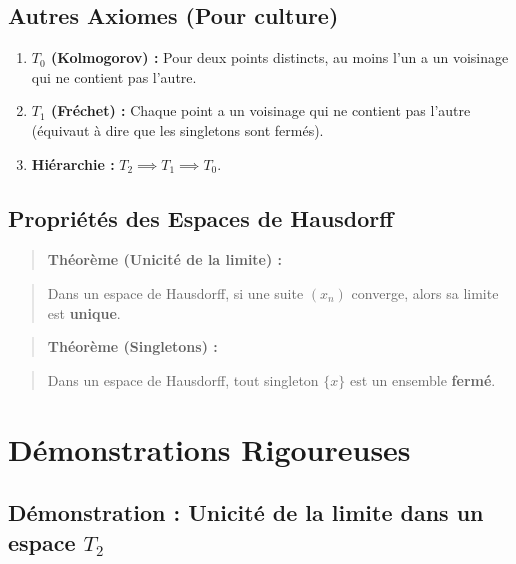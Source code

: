 \documentclass[11pt,a4paper]{article}
\begin{document}
\subsection{Autres Axiomes (Pour culture)}

\begin{enumerate}
\item \textbf{$T_0$ (Kolmogorov) :} Pour deux points distincts, au moins l'un a un voisinage qui ne contient pas l'autre.

\item \textbf{$T_1$ (Fréchet) :} Chaque point a un voisinage qui ne contient pas l'autre (équivaut à dire que les singletons sont fermés).

\item \textbf{Hiérarchie :} $T_2 \implies T_1 \implies T_0$.
\end{enumerate}

\subsection{Propriétés des Espaces de Hausdorff}

\begin{quote}
\textbf{Théorème (Unicité de la limite) :}
\end{quote}
\begin{quote}
Dans un espace de Hausdorff, si une suite $(x_n)$ converge, alors sa limite est \textbf{unique}.
\end{quote}

\begin{quote}
\textbf{Théorème (Singletons) :}
\end{quote}
\begin{quote}
Dans un espace de Hausdorff, tout singleton $\{x\}$ est un ensemble \textbf{fermé}.
\end{quote}

\section{Démonstrations Rigoureuses}

\subsection{Démonstration : Unicité de la limite dans un espace $T_2$}
\end{document}
